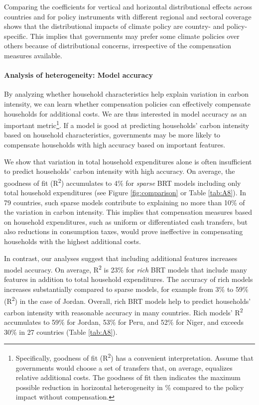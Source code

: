 \documentclass[12pt, a4paper]{article}
\begin{document}
Comparing the coefficients for vertical and horizontal distributional effects across countries and for policy instruments with different regional and sectoral coverage shows that the distributional impacts of climate policy are country- and policy-specific. This implies that governments may prefer some climate policies over others because of distributional concerns, irrespective of the compensation measures available.

\paragraph{Analysis of heterogeneity: Model accuracy} 
By analyzing whether household characteristics help explain variation in carbon intensity, we can learn whether compensation policies can effectively compensate households for additional costs. We are thus interested in model accuracy as an important metric\footnote{Specifically, goodness of fit (R\textsuperscript{2}) has a convenient interpretation. Assume that governments would choose a set of transfers that, on average, equalizes relative additional costs. The goodness of fit then indicates the maximum possible reduction in horizontal heterogeneity in \% compared to the policy impact without compensation.}. If a model is good at predicting households' carbon intensity based on household characteristics, governments may be more likely to compensate households with high accuracy based on important features. 

We show that variation in total household expenditures alone is often insufficient to predict households' carbon intensity with high accuracy. On average, the goodness of fit (R\textsuperscript{2}) accumulates to 4\% for \textit{sparse} BRT models including only total household expenditures (see Figure \ref{fig:comparison} or Table \ref{tab:A8}). In 79 countries, such sparse models contribute to explaining no more than 10\% of the variation in carbon intensity. This implies that compensation measures based on household expenditures, such as uniform or differentiated cash transfers, but also reductions in consumption taxes, would prove ineffective in compensating households with the highest additional costs.

In contrast, our analyses suggest that including additional features increases model accuracy. On average, R\textsuperscript{2} is 23\% for \textit{rich} BRT models that include many features in addition to total household expenditures. The accuracy of rich models increases substantially compared to sparse models, for example from 3\% to 59\% (R\textsuperscript{2}) in the case of Jordan. Overall, rich BRT models help to predict households' carbon intensity with reasonable accuracy in many countries. Rich models' R\textsuperscript{2} accumulates to 59\% for Jordan, 53\% for Peru, and 52\% for Niger, and exceeds 30\% in 27 countries (Table \ref{tab:A8}).
\end{document}
